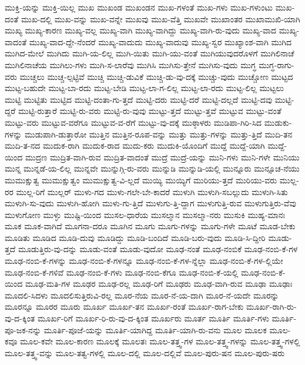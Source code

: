 {ಮುಕ್ತಿ-ಯನ್ನು
ಮುಕ್ತಿ-ಯಿಲ್ಲ
ಮುಖ
ಮುಖಂಡ
ಮುಖಂಡನ
ಮುಖ-ಗಳಂತೆ
ಮುಖ-ಗಳು
ಮುಖ-ಗಳುಂಟು
ಮುಖ-ದಂತೆ
ಮುಖ-ದಲ್ಲಿ
ಮುಖ-ವನ್ನು
ಮುಖ-ವನ್ನೇ
ಮುಖವು
ಮುಖ-ವೆತ್ತಿ
ಮುಖವೇ
ಮುಖಾಂತರ
ಮುಖಾಮುಖಿ-ಯಾಗಿ
ಮುಖ್ಯ
ಮುಖ್ಯ-ಕಾರಣ
ಮುಖ್ಯ-ವಲ್ಲ
ಮುಖ್ಯ-ವಾಗಿ
ಮುಖ್ಯ-ವಾಗಿದ್ದು
ಮುಖ್ಯ-ವಾಗಿ-ರು-ವುದು
ಮುಖ್ಯ-ವಾದ
ಮುಖ್ಯ-ವಾದಂತೆ
ಮುಖ್ಯ-ವಾದ-ದ್ದೇ-ನೆಂದರೆ
ಮುಖ್ಯ-ವಾದುದು
ಮುಖ್ಯ-ವಾದುವು
ಮುಖ್ಯ-ಸ್ವರ
ಮುಖ್ಯಾಂಶ-ವಾಗಿ
ಮುಗಿದ
ಮುಗಿದ-ಮೇಲೆ
ಮುಗಿದು
ಮುಗಿ-ಯ-ಲಿಲ್ಲ
ಮುಗಿ-ಯಿತು
ಮುಗಿ-ಯು-ವಂತೆ
ಮುಗಿಯುವುದರೊಳಗೆ
ಮುಗಿಲಿನಾಚೆ
ಮುಗಿಲಿನಾಚೆಯ
ಮುಗಿಲು-ಗಳು
ಮುಗಿ-ಸ-ಲಾರೆವು
ಮುಗಿಸಿ
ಮುಗಿಸು-ತ್ತೇನೆ
ಮುಗಿಸು-ವುದು
ಮುಗ್ಧ
ಮುಗ್ಧ-ರಾಗು-ವರು
ಮುಚ್ಚಲು
ಮುಚ್ಚ-ಲ್ಪಟ್ಟಿವೆ
ಮುಚ್ಚಿ
ಮುಚ್ಚಿ-ಡುವಿಕೆ
ಮುಚ್ಚಿ-ಡು-ವು-ದಕ್ಕೆ
ಮುಚ್ಚು-ವುದು
ಮುಚ್ಚೋಣ
ಮುಟ್ಟದ
ಮುಟ್ಟ-ಬಹುದೇ
ಮುಟ್ಟ-ಬಾ-ರದು
ಮುಟ್ಟ-ಬೇಡಿ
ಮುಟ್ಟ-ಲಾ-ಗ-ಲಿಲ್ಲ
ಮುಟ್ಟ-ಲಾ-ರದು
ಮುಟ್ಟ-ಲಿಲ್ಲ
ಮುಟ್ಟಲು
ಮುಟ್ಟಿ
ಮುಟ್ಟಿತು
ಮುಟ್ಟಿದ
ಮುಟ್ಟಿ-ದಂತಾ-ಗು-ತ್ತದೆ
ಮುಟ್ಟಿ-ದರು
ಮುಟ್ಟಿ-ದರೆ
ಮುಟ್ಟಿ-ದಲ್ಲದೆ
ಮುಟ್ಟಿ-ದವು
ಮುಟ್ಟಿ-ದ್ದರೆ
ಮುಟ್ಟಿ-ರುತ್ತಾರೆ
ಮುಟ್ಟಿ-ರು-ವರು
ಮುಟ್ಟಿ-ರು-ವುವು
ಮುಟ್ಟು-ತ್ತದೆ
ಮುಟ್ಟು-ತ್ತವೆ
ಮುಟ್ಟುವ
ಮುಟ್ಟು-ವಂತೆ
ಮುಟ್ಟು-ವರು
ಮುಟ್ಟುವ-ವರೆಗೂ
ಮುಟ್ಟುವ-ವ-ರೆಗೆ
ಮುಟ್ಟು-ವು-ದಕ್ಕೆ
ಮುಠ್ಠಾಳರು
ಮುಡಿಪಾ-ಗಿರಿ-ಸಿದ
ಮುಡುಕು-ಗಳನ್ನು
ಮುಡುಪಾಗಿ-ಡುತ್ತಾರೋ
ಮುತ್ತಿನ
ಮುತ್ತಿನ-ರೂಪ-ವನ್ನು
ಮುತ್ತು
ಮುತ್ತು-ಗಳನ್ನು
ಮುತ್ತು-ತ್ತಿದೆ
ಮುದಿ-ತನ
ಮುದಿ-ತ-ನದ
ಮುದುಕ-ರಾಗಿ
ಮುದುಕ-ರಾದ
ಮುದು-ಕರು
ಮುದುಕಿ-ಯೊಂದಿಗೆ
ಮುದ್ದೆ
ಮುದ್ದೆ-ಯಾಗಿ
ಮುದ್ದೆ-ಯಿಂದ
ಮುದ್ರಣ
ಮುದ್ರಿತ-ವಾಗಿ-ರುವ
ಮುದ್ರಿತ-ವಾದಂತೆ
ಮುದ್ರೆ
ಮುದ್ರೆ-ಯನ್ನು
ಮುನಿ-ಗಳು
ಮುನಿ-ಗಳೇ
ಮುನಿಯು
ಮುನ್ನ
ಮುನ್ನಡೆ-ಯ-ಲಿಲ್ಲ
ಮುನ್ನವೇ
ಮುನ್ನುಗ್ಗಿ-ರು-ವರು
ಮುನ್ನುಡಿ
ಮುನ್ನುಡಿ-ಯಲ್ಲಿ
ಮುನ್ನೂರು
ಮುನ್ಸೂಚ-ನೆಯು
ಮುಮುಕ್ಷುತ್ವ
ಮುಮುಕ್ಷುತ್ವಂ
ಮುಮುಕ್ಷುತ್ವ-ವಿ-ಲ್ಲದೆ
ಮುಯ್ಯಿ
ಮುಯ್ಯಿಗೆ
ಮುರಿಯು-ತ್ತದೆ
ಮುರಿಯು-ವರು
ಮುಲ್ಲ-ರರ
ಮುಲ್ಲ-ರಿಗೆ
ಮುಲ್ಲರ್
ಮುಳು-ಗದ
ಮುಳು-ಗಲೇ-ಬೇ-ಕಾದರೆ
ಮುಳುಗಿ
ಮುಳುಗಿ-ಸಬಲ್ಲುದು
ಮುಳುಗಿ-ಸಿತು
ಮುಳುಗಿ-ಸು-ವುದು
ಮುಳುಗಿ-ಹೋಗಿ
ಮುಳು-ಗು-ತ್ತಿದೆ
ಮುಳುಗು-ತ್ತಿ-ದ್ದಾಗ
ಮುಳುಗುತ್ತಿ-ರುವ
ಮುಳುಗುತ್ತಿರು-ವೆವು
ಮುಳುಗೋಣ
ಮುಳ್ಳು
ಮುಷ್ಟಿ-ಯಿಂದ
ಮುಸಲ-ಧಾರೆಯ
ಮುಸಲ್ಮಾನ
ಮುಸಲ್ಮಾ-ನರು
ಮುಸುಕಿ
ಮುಹ್ಯ-ಮಾನಃ
ಮೂಕ
ಮೂಕ-ವಾಗಿದೆ
ಮೂಗನಾ-ದರೂ
ಮೂಗಿನ
ಮೂಗು
ಮೂಗು-ಗಳನ್ನು
ಮೂಗು-ಗಳೇ
ಮೂಟೆ
ಮೂಡ-ಬೇಕು
ಮೂಡಿತು
ಮೂಡಿದ
ಮೂಡಿ-ದುವು
ಮೂಡಿದ್ದು
ಮೂಡಿ-ಬಂದಿದೆ
ಮೂಡಿ-ಬರು-ವುದು
ಮೂಡಿ-ಸಿ-ದ್ದೀರಿ
ಮೂಡು-ತ್ತದೆ
ಮೂಡುತ್ತಿರು-ವು-ದನ್ನು
ಮೂಡು-ವಂತೆ
ಮೂಡು-ವುದೋ
ಮೂಢ-ನಂತೆ
ಮೂಢ-ನಂಬಿಕೆ
ಮೂಢ-ನಂಬಿ-ಕೆ-ಗಳ
ಮೂಢ-ನಂಬಿ-ಕೆ-ಗಳನ್ನು
ಮೂಢ-ನಂಬಿ-ಕೆ-ಗಳನ್ನೂ
ಮೂಢ-ನಂಬಿ-ಕೆ-ಗಳ-ನ್ನೆಲ್ಲಾ
ಮೂಢ-ನಂಬಿ-ಕೆ-ಗಳ-ಲ್ಲಿಯೇ
ಮೂಢ-ನಂಬಿ-ಕೆ-ಗಳಿವೆ
ಮೂಢ-ನಂಬಿ-ಕೆ-ಗಳು
ಮೂಢ-ನಂಬಿ-ಕೆಗೂ
ಮೂಢ-ನಂಬಿ-ಕೆ-ಯಲ್ಲಿ
ಮೂಢ-ನಂಬಿ-ಕೆ-ಯಿಂದ
ಮೂಢ-ಮತಿ-ಗಳ
ಮೂಢರ
ಮೂಢ-ರಲ್ಲ
ಮೂಢ-ರಿಗೆ
ಮೂಢರು
ಮೂಢ-ವಾಗಿ-ರುವ
ಮೂಢಾ
ಮೂಢಾಃ
ಮೂದಲಿ-ಸಿದಳು
ಮೂದಲಿಸುತ್ತಿರುವಿ-ರಲ್ಲ
ಮೂರ-ನೆಯ
ಮೂರ-ನೆ-ಯ-ದಾಗಿ
ಮೂರ-ನೆ-ಯದೇ
ಮೂರನ್ನು
ಮೂರನ್ನೂ
ಮೂರರ
ಮೂರು
ಮೂರ್ಖ
ಮೂರ್ಖ-ತನ
ಮೂರ್ಖ-ರಂತೆ
ಮೂರ್ಖ-ರಾಗ-ಬೇಕು
ಮೂರ್ಖ-ರಾಗಿ-ರು-ವು-ದ-ಕ್ಕಿಂತ
ಮೂರ್ಖ-ರಿಗೆ
ಮೂರ್ಖ-ರಿ-ರು-ವು-ದ-ಕ್ಕಿಂತ
ಮೂರ್ಖರು
ಮೂರ್ತ
ಮೂರ್ತಿ
ಮೂರ್ತಿ-ಗಳು
ಮೂರ್ತಿ-ಪೂ-ಜಕ-ನನ್ನು
ಮೂರ್ತಿ-ಪೂಜೆ-ಯನ್ನು
ಮೂರ್ತಿ-ಯಾಗಿದ್ದ
ಮೂರ್ತಿ-ಯಾಗಿ-ರು-ವನು
ಮೂಲ
ಮೂಲಕ
ಮೂಲ-ಕವೂ
ಮೂಲ-ಕವೇ
ಮೂಲ-ಕಾರಣ
ಮೂಲಕ್ಕೆ
ಮೂಲತಃ
ಮೂಲ-ತತ್ತ್ವ-ಗಳ
ಮೂಲ-ತತ್ತ್ವ-ಗಳನ್ನು
ಮೂಲ-ತತ್ತ್ವ-ಗಳಲ್ಲಿ
ಮೂಲ-ತತ್ತ್ವ-ವನ್ನು
ಮೂಲ-ತತ್ವ-ಗಳಲ್ಲಿ
ಮೂಲ-ದಲ್ಲಿ
ಮೂಲ-ದಲ್ಲಿವೆ
ಮೂಲ-ಪುರು-ಷನ
ಮೂಲ-ಪುರು-ಷರು
}
